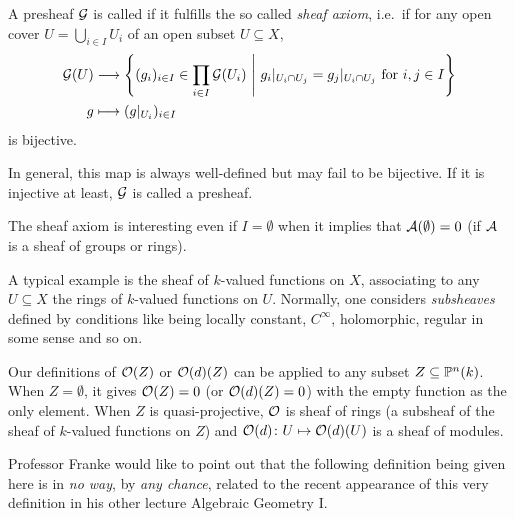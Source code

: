 \documentclass[a4paper,parskip=half,numbers=enddot, DIV=12, headheight=30pt]{scrreprt}
\begin{document}
\begin{defi}[Sheaf]
    A presheaf $\mathcal{G}$ is called  if it fulfills the so called \emph{sheaf axiom}, i.e.\ if for any open cover $U = \bigcup_{i\in I} U_i$ of an open subset $U\subseteq X$,
    \begin{align*}
        \Gg(U) &\morphism \left\{(g_i)_{i\in I}\in \prod_{i\in I} \Gg(U_i)\st g_i|_{U_i\cap U_j} = g_j|_{U_i\cap U_j} \text{ for } i,j\in I\right\}\\
        g& \longmapsto (g|_{U_i})_{i\in I}
    \end{align*}
    is bijective. 
    
    In general, this map is always well-defined but may fail to be bijective. If it is injective at least, $\mathcal{G}$ is called a  presheaf.
\end{defi}
\begin{rem}
    \begin{alphanumerate}
        \item 
            The sheaf axiom is interesting even if $I=\emptyset$ when it implies that $\mathcal{A}(\emptyset) = 0$ (if $\mathcal{A}$ is a sheaf of groups or rings).
        \item
            A typical example is the sheaf of $k$-valued functions on $X$, associating to any $U\subseteq X$ the rings of $k$-valued functions on $U$. Normally, one considers \emph{subsheaves} defined by conditions like being locally constant, $C^\infty$, holomorphic, regular in some sense and so on.
        \item 
            Our definitions of $\mathcal{O}(Z)$ or $\mathcal{O}(d)(Z)$ can be applied to any subset $Z\subseteq \mathbb{P}^n(k)$. When $Z=\emptyset$, it gives $\mathcal{O}(Z) = 0$ (or $\mathcal{O}(d)(Z) = 0$) with the empty function as the only element. When $Z$ is quasi-projective, $\mathcal{O}$ is sheaf of rings (a subsheaf of the sheaf of $k$-valued functions on $Z$) and $\mathcal{O}(d)\colon U\mapsto \mathcal{O}(d)(U)$ is a sheaf of modules.
    \end{alphanumerate}
\end{rem}

Professor Franke would like to point out that the following definition being given here is in \emph{no way}, by \emph{any chance}, related to the recent appearance of this very definition in his other lecture Algebraic Geometry I.
\end{document}

